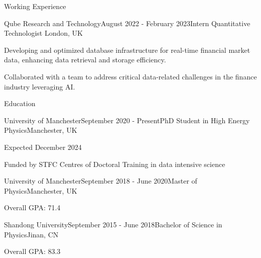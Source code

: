 \documentclass{resume} %
\begin{document}
    \begin{rSection}{Working Experience}
        \begin{rSubsection}{Qube Research and Technology}{August 2022 - February 2023}{Intern Quantitative Technologist }{London, UK}
            \item Developing and optimized database infrastructure for real-time financial market data, enhancing data retrieval and storage efficiency.
            \item Collaborated with a team to address critical data-related challenges in the finance industry leveraging AI.
        \end{rSubsection}
    \end{rSection}



    \begin{rSection}{Education}
        \begin{rSubsection}{University of Manchester}{September 2020 - Present}{PhD Student in High Energy Physics}{Manchester, UK}
            \item Expected December 2024 
            \item Funded by STFC Centres of Doctoral Training in data intensive science
        \end{rSubsection}
        \begin{rSubsection}{University of Manchester}{September 2018 - June 2020}{Master of Physics}{Manchester, UK}
            \item Overall GPA: 71.4
        \end{rSubsection}
        \begin{rSubsection}{Shandong University}{September 2015 - June 2018}{Bachelor of Science in Physics}{Jinan, CN}
            \item Overall GPA: 83.3
        \end{rSubsection}
    \end{rSection}
\end{document}
